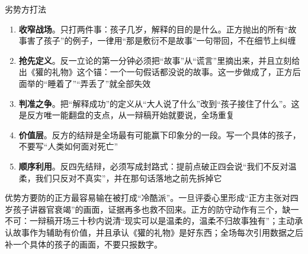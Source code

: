 \documentclass[prep,both]{debate}
\begin{document}
\begin{fields}
\begin{sidecard}{劣势方打法}\end{sidecard}
\begin{enumerate}[leftmargin=1.8em,itemsep=2pt,topsep=2pt]
\item \textbf{收窄战场}。只打两件事：孩子几岁，解释的目的是什么。正方抛出的所有“故事害了孩子”的例子，一律用“那是敷衍不是故事”一句带回，不在细节上纠缠
\item \textbf{抢先定义}。反一立论的第一分钟必须把“故事”从“谎言”里摘出来，并且立刻给出《獾的礼物》这个锚：一个一句假话都没说的故事。这一步做成了，正方后面举的“睡着了”“弄丢了”就全部失效
\item \textbf{判准之争}。把“解释成功”的定义从“大人说了什么”改到“孩子接住了什么”。这是反方唯一能翻盘的支点，从一辩稿开始就要说，全场重复
\item \textbf{价值层}。反方的结辩是全场最有可能赢下印象分的一段。写一个具体的孩子，不要写“人类如何面对死亡”
\item \textbf{顺序利用}。反四先结辩，必须写成封路式：提前点破正四会说“我们不反对温柔，我们只反对不真实”，并在那句话落地之前先拆掉它
\end{enumerate}
\begin{sidecard}{优势方要防的}正方最容易输在被打成“冷酷派”。一旦评委心里形成“正方主张对四岁孩子讲器官衰竭”的画面，证据再多也救不回来。正方的防守动作有三个，缺一不可：一辩稿开场三十秒内说清“现实可以是温柔的，温柔不归故事独有”；主动承认故事作为辅助有价值，并且承认《獾的礼物》是好东西；全场每次引用数据之后补一个具体的孩子的画面，不要只报数字。\end{sidecard}
\end{fields}
\end{document}
